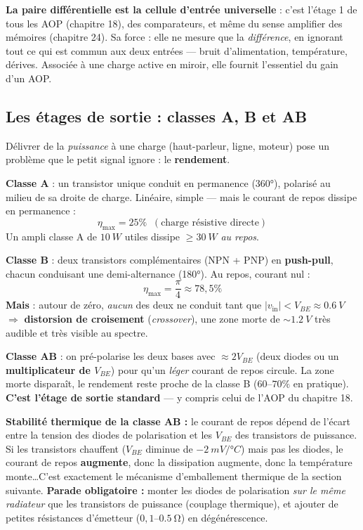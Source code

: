 \documentclass[12pt,a4paper,twoside]{book}
\begin{document}
\begin{intuition}
\textbf{La paire différentielle est la cellule d'entrée universelle} : c'est l'étage 1 de tous les AOP (chapitre 18), des comparateurs, et même du sense amplifier des mémoires (chapitre 24). Sa force : elle ne mesure que la \textit{différence}, en ignorant tout ce qui est commun aux deux entrées --- bruit d'alimentation, température, dérives. Associée à une charge active en miroir, elle fournit l'essentiel du gain d'un AOP.
\end{intuition}

\subsection{Les étages de sortie : classes A, B et AB}

\begin{formule}
Délivrer de la \textit{puissance} à une charge (haut-parleur, ligne, moteur) pose un problème que le petit signal ignore : le \textbf{rendement}.

\textbf{Classe A} : un transistor unique conduit en permanence (360°), polarisé au milieu de sa droite de charge. Linéaire, simple --- mais le courant de repos dissipe en permanence :
\[
\eta_{\max} = 25\% \;\;(\text{charge résistive directe})
\]
Un ampli classe A de $\SI{10}{W}$ utiles dissipe $\geq \SI{30}{W}$ \textit{au repos}.

\textbf{Classe B} : deux transistors complémentaires (NPN + PNP) en \textbf{push-pull}, chacun conduisant une demi-alternance (180°). Au repos, courant nul :
\[
\eta_{\max} = \frac{\pi}{4} \approx 78{,}5\%
\]
\textbf{Mais} : autour de zéro, \textit{aucun} des deux ne conduit tant que $|v_{\text{in}}| < V_{BE} \approx \SI{0.6}{V}$ $\Rightarrow$ \textbf{distorsion de croisement} (\textit{crossover}), une zone morte de $\sim\SI{1.2}{V}$ très audible et très visible au spectre.

\textbf{Classe AB} : on pré-polarise les deux bases avec $\approx 2V_{BE}$ (deux diodes ou un \textbf{multiplicateur de $V_{BE}$}) pour qu'un \textit{léger} courant de repos circule. La zone morte disparaît, le rendement reste proche de la classe B ($60$--$70\%$ en pratique). \textbf{C'est l'étage de sortie standard} --- y compris celui de l'AOP du chapitre 18.
\end{formule}

\begin{attention}
\textbf{Stabilité thermique de la classe AB :} le courant de repos dépend de l'écart entre la tension des diodes de polarisation et les $V_{BE}$ des transistors de puissance. Si les transistors chauffent ($V_{BE}$ diminue de $\SI{-2}{mV/°C}$) mais pas les diodes, le courant de repos \textbf{augmente}, donc la dissipation augmente, donc la température monte\ldots C'est exactement le mécanisme d'emballement thermique de la section suivante. \textbf{Parade obligatoire :} monter les diodes de polarisation \textit{sur le même radiateur} que les transistors de puissance (couplage thermique), et ajouter de petites résistances d'émetteur ($0{,}1$--$\SI{0.5}{\ohm}$) en dégénérescence.
\end{attention}
\end{document}
